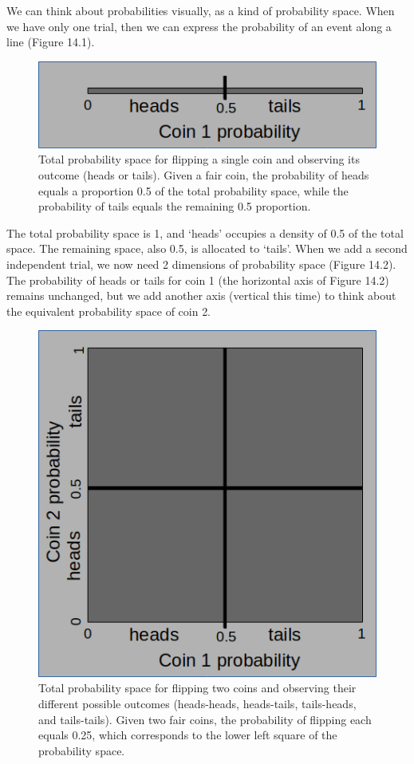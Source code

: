 \documentclass[
]{scrbook}
\begin{document}
We can think about probabilities visually, as a kind of probability space.
When we have only one trial, then we can express the probability of an event along a line (Figure 14.1).

\begin{figure}
\includegraphics[width=1\linewidth]{img/coin1_probability} \caption{Total probability space for flipping a single coin and observing its outcome (heads or tails). Given a fair coin, the probability of heads equals a proportion 0.5 of the total probability space, while the probability of tails equals the remaining 0.5 proportion.}\label{fig:unnamed-chunk-53}
\end{figure}

The total probability space is 1, and `heads' occupies a density of 0.5 of the total space.
The remaining space, also 0.5, is allocated to `tails'.
When we add a second independent trial, we now need 2 dimensions of probability space (Figure 14.2).
The probability of heads or tails for coin 1 (the horizontal axis of Figure 14.2) remains unchanged, but we add another axis (vertical this time) to think about the equivalent probability space of coin 2.

\begin{figure}
\includegraphics[width=1\linewidth]{img/coin2_probability} \caption{Total probability space for flipping two coins and observing their different possible outcomes (heads-heads, heads-tails, tails-heads, and tails-tails). Given two fair coins, the probability of flipping each equals 0.25, which corresponds to the lower left square of the probability space.}\label{fig:unnamed-chunk-54}
\end{figure}
\end{document}
